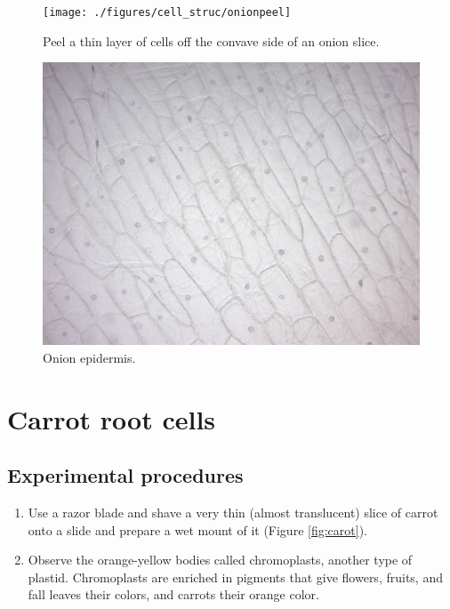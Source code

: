 \begin{figure}

{\centering \texttt{[image: ./figures/cell\_struc/onionpeel]} 

}

\caption{Peel a thin layer of cells off the convave side of an onion slice.}\label{fig:onionpeel}
\end{figure}


\begin{figure}

{\centering \includegraphics[width=0.7\linewidth]{./figures/cell_struc/onion} 

}

\caption{Onion epidermis.}\label{fig:onion}
\end{figure}


\section{Carrot root cells}\label{carrot-root-cells}

\subsection{Experimental procedures}\label{experimental-procedures-9}

\begin{enumerate}
\def\labelenumi{\arabic{enumi}.}
\tightlist
\item
  Use a razor blade and shave a very thin (almost translucent) slice of
  carrot onto a slide and prepare a wet mount of it (Figure \ref{fig:carot}).
\item
  Observe the orange-yellow bodies called chromoplasts, another type of
  plastid. Chromoplasts are enriched in pigments that give flowers,
  fruits, and fall leaves their colors, and carrots their orange color.
\end{enumerate}

